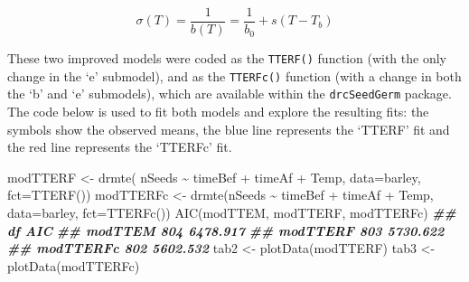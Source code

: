 \documentclass[
]{book}
\newenvironment{Shaded}{\begin{snugshade}}{\end{snugshade}}
\newcommand{\AttributeTok}[1]{\textcolor[rgb]{0.77,0.63,0.00}{#1}}
\newcommand{\DocumentationTok}[1]{\textcolor[rgb]{0.56,0.35,0.01}{\textbf{\textit{#1}}}}
\newcommand{\FunctionTok}[1]{\textcolor[rgb]{0.00,0.00,0.00}{#1}}
\newcommand{\NormalTok}[1]{#1}
\newcommand{\OtherTok}[1]{\textcolor[rgb]{0.56,0.35,0.01}{#1}}
\newcommand{\SpecialCharTok}[1]{\textcolor[rgb]{0.00,0.00,0.00}{#1}}
\begin{document}
\[ \sigma(T) = \frac{1}{b(T)} = \frac{1}{b_0} + s (T - T_b)\]

These two improved models were coded as the \texttt{TTERF()} function (with the only change in the `e' submodel), and as the \texttt{TTERFc()} function (with a change in both the `b' and `e' submodels), which are available within the \texttt{drcSeedGerm} package. The code below is used to fit both models and explore the resulting fits: the symbols show the observed means, the blue line represents the `TTERF' fit and the red line represents the `TTERFc' fit.

\begin{Shaded}
\begin{Highlighting}[]
\NormalTok{modTTERF }\OtherTok{\textless{}{-}} \FunctionTok{drmte}\NormalTok{( nSeeds }\SpecialCharTok{\textasciitilde{}}\NormalTok{ timeBef }\SpecialCharTok{+}\NormalTok{ timeAf }\SpecialCharTok{+}\NormalTok{ Temp, }\AttributeTok{data=}\NormalTok{barley,}
               \AttributeTok{fct=}\FunctionTok{TTERF}\NormalTok{())}
\NormalTok{modTTERFc }\OtherTok{\textless{}{-}} \FunctionTok{drmte}\NormalTok{(nSeeds }\SpecialCharTok{\textasciitilde{}}\NormalTok{ timeBef }\SpecialCharTok{+}\NormalTok{ timeAf }\SpecialCharTok{+}\NormalTok{ Temp, }\AttributeTok{data=}\NormalTok{barley,}
               \AttributeTok{fct=}\FunctionTok{TTERFc}\NormalTok{())}
\FunctionTok{AIC}\NormalTok{(modTTEM, modTTERF, modTTERFc)}
\DocumentationTok{\#\#            df      AIC}
\DocumentationTok{\#\# modTTEM   804 6478.917}
\DocumentationTok{\#\# modTTERF  803 5730.622}
\DocumentationTok{\#\# modTTERFc 802 5602.532}
\NormalTok{tab2 }\OtherTok{\textless{}{-}} \FunctionTok{plotData}\NormalTok{(modTTERF)}
\NormalTok{tab3 }\OtherTok{\textless{}{-}} \FunctionTok{plotData}\NormalTok{(modTTERFc)}


\end{Highlighting}
\end{Shaded}
\end{document}
